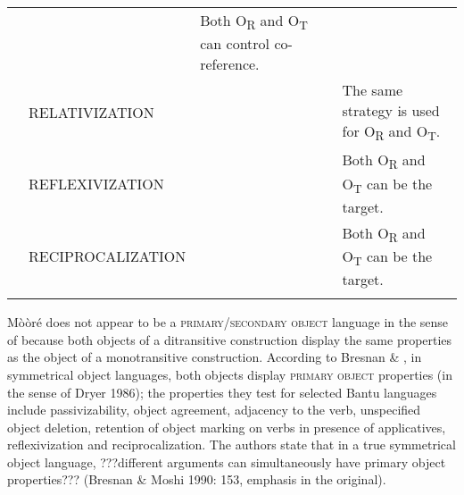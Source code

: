 \documentclass[output=paper]{langsci/langscibook}
\begin{document}
{{{{{{{\begin{tabular}{lllll}
\end{itemize} & 
\end{itemize} & Both O\textsubscript{R }and O\textsubscript{T} can control co-reference.\\
\hhline{~----} & RELATIVIZATION & 
\end{itemize} & 
\end{itemize} & The same strategy is used for O\textsubscript{R} and O\textsubscript{T}.\\
\hhline{~----} & REFLEXIVIZATION & 
\end{itemize} & 
\end{itemize} & Both O\textsubscript{R }and O\textsubscript{T }can be the target.\\
\hhline{~----} & RECIPROCALIZATION & 
\end{itemize} & 
\end{itemize} & Both O\textsubscript{R }and O\textsubscript{T }can be the target.\\
\hhline{~----}
\lspbottomrule
\end{tabular}
M\`{o}\`{o}r\'{e} does not appear to be a \textsc{primary}/\textsc{secondary object }language in the sense of \citet{Dryer1986} because both objects of a ditransitive construction display the same properties as the object of a monotransitive construction.{ }According to Bresnan \& \citet[147]{Moshi1991}, in symmetrical object languages, both objects display \textsc{primary object} properties (in the sense of Dryer 1986); the properties they test for selected Bantu languages include passivizability, object agreement, adjacency to the verb, unspecified object deletion, retention of object marking on verbs in presence of applicatives, reflexivization and reciprocalization. The authors state that in a true symmetrical object language, ???different arguments can simultaneously have primary object properties??? (Bresnan \& Moshi 1990: 153, emphasis in the original).

}}}}}}}
\end{document}
